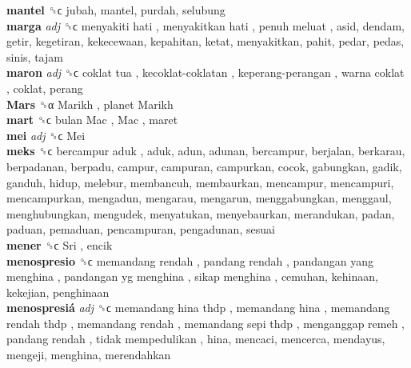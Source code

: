 \textbf{mantel} ␝ϲ  jubah, mantel, purdah, selubung  \\
\textbf{marga} \emph{adj}  ␝ϲ   menyakiti hati ,  menyakitkan hati ,  penuh meluat , asid, dendam, getir, kegetiran, kekecewaan, kepahitan, ketat, menyakitkan, pahit, pedar, pedas, sinis, tajam  \\
\textbf{maron} \emph{adj}  ␝ϲ   coklat tua ,  kecoklat-coklatan ,  keperang-perangan ,  warna coklat , coklat, perang  \\
\textbf{Mars} ␝α   Marikh ,  planet Marikh   \\
\textbf{mart} ␝ϲ   bulan Mac ,  Mac , maret  \\
\textbf{mei} \emph{adj}  ␝ϲ   Mei   \\
\textbf{meks} ␝ϲ   bercampur aduk , aduk, adun, adunan, bercampur, berjalan, berkarau, berpadanan, berpadu, campur, campuran, campurkan, cocok, gabungkan, gadik, ganduh, hidup, melebur, membancuh, membaurkan, mencampur, mencampuri, mencampurkan, mengadun, mengarau, mengarun, menggabungkan, menggaul, menghubungkan, mengudek, menyatukan, menyebaurkan, merandukan, padan, paduan, pemaduan, pencampuran, pengadunan, sesuai  \\
\textbf{mener} ␝ϲ   Sri , encik  \\
\textbf{menospresio} ␝ϲ   memandang rendah ,  pandang rendah ,  pandangan yang menghina ,  pandangan yg menghina ,  sikap menghina , cemuhan, kehinaan, kekejian, penghinaan  \\
\textbf{menospresiá} \emph{adj}  ␝ϲ   memandang hina thdp ,  memandang hina ,  memandang rendah thdp ,  memandang rendah ,  memandang sepi thdp ,  menganggap remeh ,  pandang rendah ,  tidak mempedulikan , hina, mencaci, mencerca, mendayus, mengeji, menghina, merendahkan  \\

